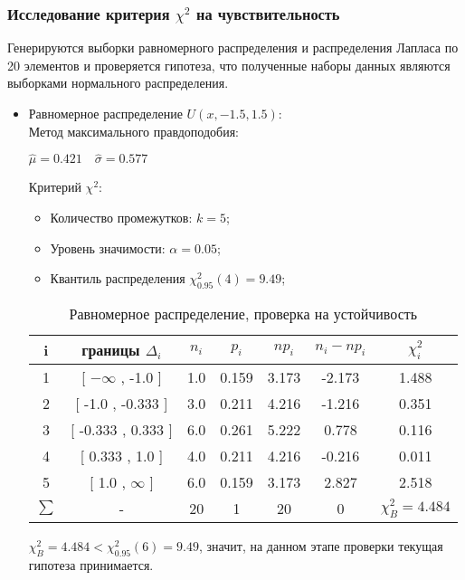 \documentclass[12pt,a4paper]{article}
\begin{document}
				\newpage
				\subsubsection{Исследование критерия $\chi^2$ на чувствительность}
				Генерируются выборки равномерного распределения и распределения Лапласа по 20 элементов и проверяется гипотеза, что полученные наборы данных являются выборками нормального распределения.
				\begin{itemize}
					\item Равномерное распределение $U(x, -1.5, 1.5)$:\\
					Метод максимального правдоподобия:
					\begin{center}
						$\hat{\mu}=0.421 \quad \hat{\sigma} = 0.577$
					\end{center}
					Критерий $\chi^2:$
					\begin{itemize}
						\item Количество промежутков: $k=5$;
						\item Уровень значимости: $\alpha=0.05$;
						\item Квантиль распределения $\chi^2_{0.95}(4)=9.49$;
					\end{itemize}
					\begin{table}[h!]
						\begin{center}
							\begin{tabular}{|c|c|c|c|c|c|c|}
								\hline
								i & границы $\Delta_i$ & $n_i$ & $p_i$ & $np_i$ & $n_i-np_i$ & $\chi_i^2$ \\ \hline
								1 & [ $-\infty$ , -1.0 ] & 1.0 & 0.159 & 3.173 & -2.173 & 1.488 \\ \hline
								2 & [ -1.0 , -0.333 ] & 3.0 & 0.211 & 4.216 & -1.216 & 0.351 \\ \hline
								3 & [ -0.333 , 0.333 ] & 6.0 & 0.261 & 5.222 & 0.778 & 0.116 \\ \hline
								4 & [ 0.333 , 1.0 ] & 4.0 & 0.211 & 4.216 & -0.216 & 0.011 \\ \hline
								5 & [ 1.0 , $\infty$ ] & 6.0 & 0.159 & 3.173 & 2.827 & 2.518 \\ \hline
								$\sum$ & - & 20 & 1 & 20 & 0 & $\chi_B^2=4.484$ \\ \hline
							\end{tabular}
						\caption{Равномерное распределение, проверка на устойчивость}
						\end{center}
					\end{table}
					$\chi_B^2 = 4.484 <  \chi^2_{0.95}(6)=9.49$, значит, на данном этапе проверки текущая гипотеза принимается.
					

\end{itemize}
\end{document}
